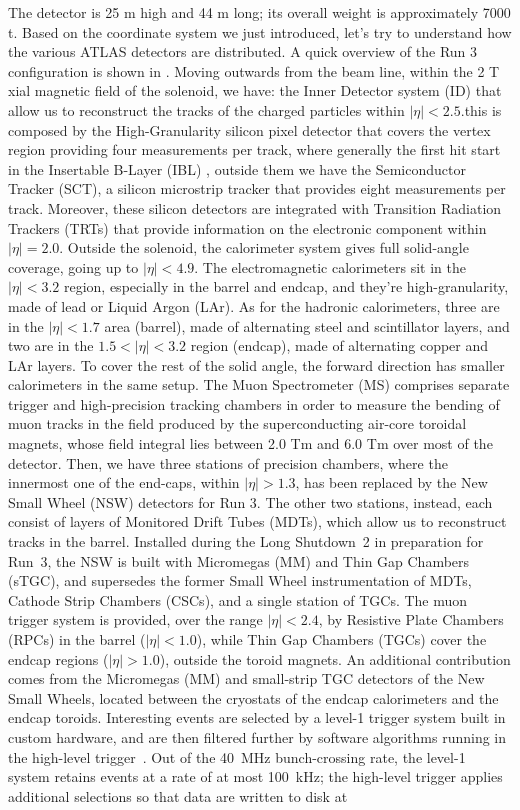 \documentclass[11pt,a4paper,twoside,openright]{report}
\begin{document}
The detector is 25 m high and 44 m long; its overall weight is approximately 7000 t. Based on the coordinate system we just introduced, let's try to understand how the various ATLAS detectors are distributed. A quick overview of the Run 3 configuration is shown in . Moving outwards from the beam line, within the 2 T xial magnetic field of the solenoid, we have: the Inner Detector system (ID) that allow us to reconstruct the tracks of the charged particles within \(|\eta|<2.5\).this is composed by the High-Granularity silicon pixel detector that covers the vertex region providing four measurements per track, where generally the first hit start in the Insertable B-Layer (IBL) \cite{ATLAScollab2, ATLASibl}, outside them we have the Semiconductor Tracker (SCT), a silicon microstrip tracker that provides eight measurements per track. Moreover, these silicon detectors are integrated with Transition Radiation Trackers (TRTs) that provide information on the electronic component within \(|\eta|=2.0\). Outside the solenoid, the calorimeter system gives full solid-angle coverage, going up to \(|\eta|<4.9\). The electromagnetic calorimeters sit in the \(|\eta|<3.2\) region, especially in the barrel and endcap, and they’re high-granularity, made of lead or Liquid Argon (LAr). As for the hadronic calorimeters, three are in the \(|\eta|<1.7\) area (barrel), made of alternating steel and scintillator layers, and two are in the \(1.5<|\eta|<3.2\) region (endcap), made of alternating copper and LAr layers. To cover the rest of the solid angle, the forward direction has smaller calorimeters in the same setup. The Muon Spectrometer (MS) comprises separate trigger and high-precision tracking chambers in order to measure the bending of muon tracks in the field produced by the superconducting air-core toroidal magnets, whose field integral lies between 2.0 Tm and 6.0 Tm over most of the detector. Then, we have three stations of precision chambers, where the innermost one of the end-caps, within \(|\eta|>1.3\), has been replaced by the New Small Wheel (NSW) detectors for Run 3. The other two stations, instead, each consist of layers of Monitored Drift Tubes (MDTs), which allow us to reconstruct tracks in the barrel. Installed during the Long Shutdown~2 in preparation for Run~3, the NSW is built with Micromegas (MM) and Thin Gap Chambers (sTGC), and supersedes the former Small Wheel instrumentation of MDTs, Cathode Strip Chambers (CSCs), and a single station of TGCs. The muon trigger system is provided, over the range $|\eta| < 2.4$, by Resistive Plate Chambers (RPCs) in the barrel ($|\eta| < 1.0$), while Thin Gap Chambers (TGCs) cover the endcap regions ($|\eta| > 1.0$), outside the toroid magnets. An additional contribution comes from the Micromegas (MM) and small-strip TGC detectors of the New Small Wheels, located between the cryostats of the endcap calorimeters and the endcap toroids. Interesting events are selected by a level-1 trigger system built in custom hardware, and are then filtered further by software algorithms running in the high-level trigger~\cite{ATLAScollab3}. Out of the 40~MHz bunch-crossing rate, the level-1 system retains events at a rate of at most 100~kHz; the high-level trigger applies additional selections so that data are written to disk at 
\end{document}
